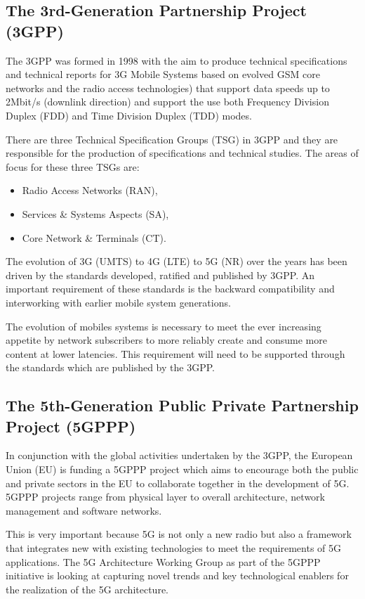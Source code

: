 \subsection{The 3rd-Generation Partnership Project (3GPP)}

The 3GPP was formed in 1998 with the aim to produce technical
specifications and technical reports for 3G Mobile Systems based on
evolved GSM core networks and the radio access technologies) that support
data speeds up to 2Mbit/s (downlink direction) and support the use both
Frequency Division Duplex (FDD) and Time Division Duplex (TDD) modes.

There are three Technical Specification Groups (TSG) in 3GPP and they
are responsible for the production of specifications and technical
studies. The areas of focus for these three TSGs are:

\begin{itemize}
\item Radio Access Networks (RAN),
\item Services \& Systems Aspects (SA),
\item Core Network \& Terminals (CT).
\end{itemize} 

The evolution of 3G (UMTS) to 4G (LTE) to 5G (NR) over the years has been
driven by the standards developed, ratified and published by 3GPP. An
important requirement of these standards is the backward compatibility
and interworking with earlier mobile system generations.

The evolution of mobiles systems is necessary to meet the ever increasing
appetite by network subscribers to more reliably create and consume more
content at lower latencies.  This requirement will need to be supported
through the standards which are published by the 3GPP.

\subsection{The 5th-Generation Public Private Partnership Project (5GPPP)}

In conjunction with the global activities undertaken by the 3GPP, the
European Union (EU) is funding a 5GPPP project which aims to encourage
both the public and private sectors in the EU to collaborate together
in the development of 5G. 5GPPP projects range from physical layer to
overall architecture, network management and software networks.

This is very important because 5G is not only a new radio but also a
framework that integrates new with existing technologies to meet the
requirements of 5G applications. The 5G Architecture Working Group as
part of the 5GPPP initiative is looking at capturing novel trends and
key technological enablers for the realization of the 5G architecture.

